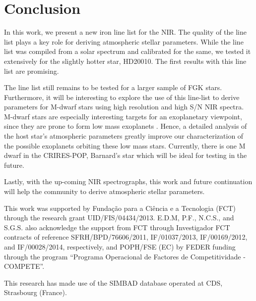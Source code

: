 \documentclass{aa}
\begin{document}
\section{Conclusion}
In this work, we present a new iron line list for the NIR. The quality
of the line list plays a key role for deriving atmospheric stellar
parameters. While the line list was compiled from a solar spectrum
and calibrated for the same, we tested it extensively for the slightly
hotter star, HD20010. The first results with this line list are promising.

The line list still remains to be tested for a larger sample of FGK
stars. Furthermore, it will be interesting to explore the use of this
line-list to derive parameters for M-dwarf stars using high resolution
and high S/N NIR spectra. M-dwarf stars are especially interesting
targets for an exoplanetary viewpoint, since they are prone to form low
mass exoplanets \citep{Bonfils2013}. Hence, a detailed analysis of the
host star's atmospheric parameters greatly improve our characterization
of the possible exoplanets orbiting these low mass stars. Currently,
there is one M dwarf in the CRIRES-POP, Barnard's star which will be
ideal for testing in the future.

Lastly, with the up-coming NIR spectrographs, this work and future
continuation will help the community to derive atmospheric stellar
parameters.





\begin{acknowledgements}

This work was supported by Funda\c{c}\~ao para a Ci\^encia e a
Tecnologia (FCT) through the research grant UID/FIS/04434/2013.
E.D.M, P.F., N.C.S., and S.G.S. also acknowledge the support from FCT
through Investigador FCT contracts of reference SFRH/BPD/76606/2011,
IF/01037/2013, IF/00169/2012, and IF/00028/2014, respectively, and
POPH/FSE (EC) by FEDER funding through the program “Programa
Operacional de Factores de Competitividade - COMPETE”.

This research has made use of the SIMBAD database operated at CDS,
Strasbourg (France).

\end{acknowledgements}








\end{document}
